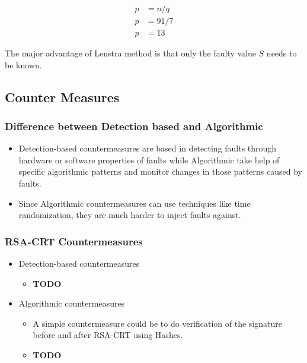 \documentclass[1p,16pt]{elsarticle}
\begin{document}
\begin{align}
	p &= n / q \\
	p &= 91 / 7 \\
	p &= 13
\end{align}

The major advantage of Lenstra method is that only the faulty value $\overline{S}$ needs to be known.



\subsection{Counter Measures}%
\label{sub:counter_measures}

\subsubsection{Difference between Detection based and Algorithmic}%
\label{sub:difference_between_detection_based_and_algorithmic}
\begin{itemize}
	\item Detection-based countermeasures are based in detecting faults through hardware or software properties
		of faults while Algorithmic take help of specific algorithmic patterns and monitor changes in those
		patterns caused by faults.
	\item Since Algorithmic countermeasures can use techniques like time randomization, they are much harder
		to inject faults against.
\end{itemize}

\subsubsection{RSA-CRT Countermeasures}%
\label{sub:rsa_crt_countermeasures}
\begin{itemize}
	\item Detection-based countermeasures
		\begin{itemize}
			\item \textbf{TODO}
		\end{itemize}
	\item Algorithmic countermeasures
		\begin{itemize}
			\item A simple countermeasure could be to do verification of the signature before and after
				RSA-CRT using Hashes.
			\item \textbf{TODO}
		\end{itemize}
\end{itemize}
\end{document}

